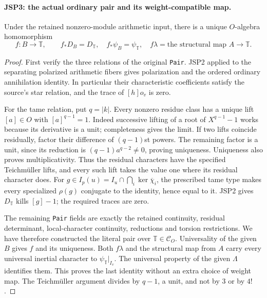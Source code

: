 \paragraph{JSP3: the actual ordinary pair and its weight-compatible map.}
\label{claim:JSP3}
Under the retained nonzero-module arithmetic input, there is a
unique $O$-algebra homomorphism
\[
 f:B\longrightarrow\mathbb T,\qquad
 f_*D_B=D_{\mathbb T},\quad f_*\psi_B=\psi_{\mathbb T},\quad
 f\lambda=\text{the structural map }A\longrightarrow\mathbb T.
 \tag{JSP.5}
\]
\begin{proof}
First verify the three relations of the original \texttt{Pair}.
JSP2 applied to the separating polarized arithmetic fibers gives
polarization and the ordered ordinary annihilation identity.
In particular their characteristic coefficients satisfy the
source's star relation, and the trace of $[h]o_v$ is zero.

For the tame relation, put $q=|k|$. Every nonzero residue class
has a unique lift $[a]\in O$ with $[a]^{q-1}=1$.
Indeed successive lifting of a root of $X^{q-1}-1$ works because
its derivative is a unit; completeness gives the limit. If two
lifts coincide residually, factor their difference of
$(q-1)$st powers. The remaining factor is a unit, since its
reduction is $(q-1)a^{q-2}\ne0$, proving uniqueness.
Uniqueness also proves multiplicativity. Thus the residual
characters have the specified Teichm\"uller lifts, and every such
lift takes the value one where its residual character does.
For $g\in I_p(u)=I_u\cap\bigcap_i\ker\overline\chi_i$,
the prescribed tame type makes every specialized $\rho(g)$
conjugate to the identity, hence equal to it. JSP2 gives
$D_{\mathbb T}$ kills $[g]-1$; the required traces are zero.

The remaining \texttt{Pair} fields are exactly the retained
continuity, residual determinant, local-character continuity,
reductions and torsion restrictions. We have therefore constructed
the literal pair over $\mathbb T\in\mathcal C_O$.
Universality of the given $B$ gives $f$ and its uniqueness.
Both $f\lambda$ and the structural map from $A$ carry every
universal inertial character to $\psi_{\mathbb T}|_{I_v}$.
The universal property of the given $\Lambda$ identifies them.
This proves the last identity without an extra choice of weight map.
The Teichm\"uller argument divides by $q-1$, a unit, and not by
$3$ or by $4!$.
\end{proof}

